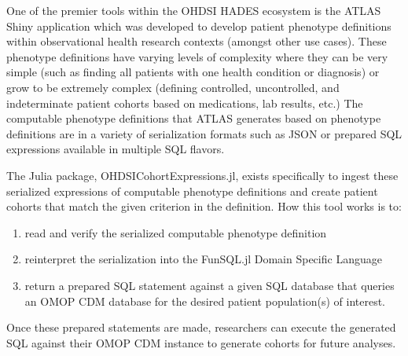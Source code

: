 \documentclass{juliacon}
\begin{document}

One of the premier tools within the OHDSI HADES ecosystem is the ATLAS Shiny application which was developed to develop patient phenotype definitions within observational health research contexts (amongst other use cases).
These phenotype definitions have varying levels of complexity where they can be very simple (such as finding all patients with one health condition or diagnosis) or grow to be extremely complex (defining controlled, uncontrolled, and indeterminate patient cohorts based on medications, lab results, etc.)
The computable phenotype definitions that ATLAS generates based on phenotype definitions are in a variety of serialization formats such as JSON or prepared SQL expressions available in multiple SQL flavors.\cite{madrilATLASJSONSchema2022}

The Julia package, OHDSICohortExpressions.jl, exists specifically to ingest these serialized expressions of computable phenotype definitions and create patient cohorts that match the given criterion in the definition. \cite{evansOHDSICohortExpressionsJl2023}
How this tool works is to:

\begin{enumerate}

\item read and verify the serialized computable phenotype definition 

\item reinterpret the serialization into the FunSQL.jl Domain Specific Language 

\item return a prepared SQL statement against a given SQL database that queries an OMOP CDM database for the desired patient population(s) of interest.

\end{enumerate}

Once these prepared statements are made, researchers can execute the generated SQL against their OMOP CDM instance to generate cohorts for future analyses.
\end{document}
